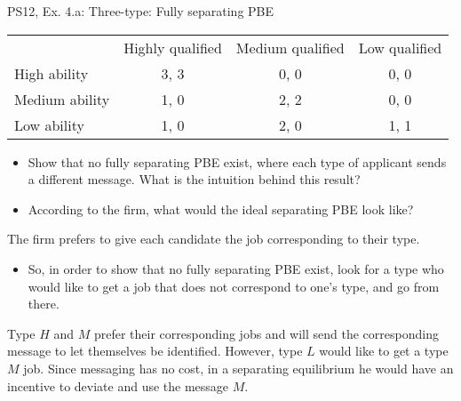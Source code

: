 \begin{frame}{PS12, Ex. 4.a: Three-type: Fully separating PBE}
    \begin{table}
      \begin{tabular}{l|c|c|c|}
          \multicolumn{1}{c}{} & \multicolumn{1}{c}{Highly qualified} & \multicolumn{1}{c}{Medium qualified} & \multicolumn{1}{c}{Low qualified} \\\cline{2-4}
          High ability   & 3, 3 & 0, 0 & 0, 0 \\\cline{2-4}
          Medium ability & 1, 0 & 2, 2 & 0, 0 \\\cline{2-4}
          Low ability    & 1, 0 & 2, 0 & 1, 1 \\\cline{2-4}
      \end{tabular}
    \end{table}\vspace{-8pt}
    \begin{itemize}
      \item[(a)] Show that no fully separating PBE exist, where each type of applicant sends a different message. What is the intuition behind this result?
      \item[Step 1:] According to the firm, what would the ideal separating PBE look like?
    \end{itemize}\vspace{-6pt}
    The firm prefers to give each candidate the job corresponding to their type.\vspace{-4pt}
    \begin{itemize}
      \item[Step 2:] So, in order to show that no fully separating PBE exist, look for a type who would like to get a job that does not correspond to one's type, and go from there.
    \end{itemize}\vspace{-6pt}
    Type $H$ and $M$ prefer their corresponding jobs and will send the corresponding message to let themselves be identified. However, type $L$ would like to get a type $M$ job. Since messaging has no cost, in a separating equilibrium he would have an incentive to deviate and use the message $M$.
    \vfill\null
\end{frame}
